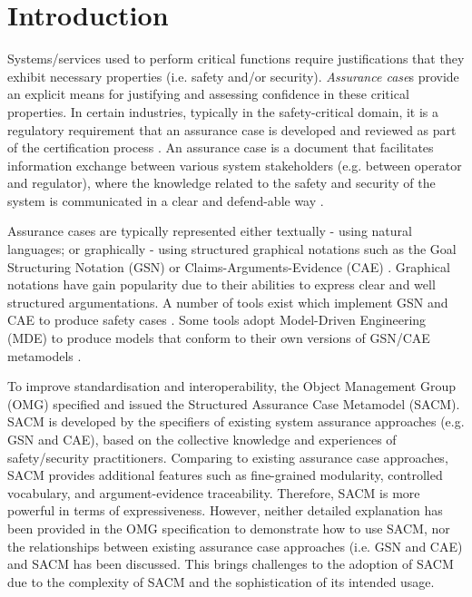 \section{Introduction}
Systems/services used to perform critical functions require justifications that they exhibit necessary properties (i.e. safety and/or security). 
\textit{Assurance case}s provide an explicit means for justifying and assessing confidence in these critical properties. 
In certain industries, typically in the safety-critical domain, it is a regulatory requirement that an assurance case is developed and reviewed as part of the certification process \cite{healthFound}.
An assurance case is a document that facilitates information exchange between various system stakeholders (e.g. between operator and regulator), where the knowledge related to the safety and security of the system is communicated in a clear and defend-able way \cite{hawkins2013assurance}. 

Assurance cases are typically represented either textually - using natural languages; or graphically - using structured graphical notations such as the Goal Structuring Notation (GSN) \cite{kelly2004goal} or Claims-Arguments-Evidence (CAE) \cite{bishop2000methodology}. 
Graphical notations have gain popularity due to their abilities to express clear and well structured argumentations.
A number of tools exist which implement GSN and CAE to produce safety cases \cite{maksimov2018}. 
Some tools adopt Model-Driven Engineering (MDE) to produce models that conform to their own versions of GSN/CAE metamodels \cite{denney2017tool, matsuno2010dependability, netkachova2014tool, larrucea2017supporting, barry2011certware}.

To improve standardisation and interoperability, the Object Management Group (OMG) specified and issued the Structured Assurance Case Metamodel (SACM). 
SACM is developed by the specifiers of existing system assurance approaches (e.g. GSN and CAE), based on the collective knowledge and experiences of safety/security practitioners.
Comparing to existing assurance case approaches, SACM provides additional features such as fine-grained modularity, controlled vocabulary, and argument-evidence traceability. 
Therefore, SACM is more powerful in terms of expressiveness. 
However, neither detailed explanation has been provided in the OMG specification to demonstrate how to use SACM, nor the relationships between existing assurance case approaches (i.e. GSN and CAE) and SACM has been discussed. 
This brings challenges to the adoption of SACM due to the complexity of SACM and the sophistication of its intended usage. 

